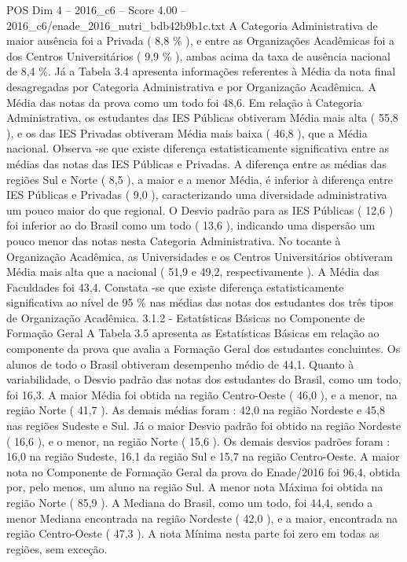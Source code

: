 \begin{textsample}{POS Dim 4 – 2016\_c6 – Score 4.00 – 2016\_c6/enade\_2016\_nutri\_bdb42b9b1c.txt}
A Categoria Administrativa de maior ausência foi a Privada ( 8,8 \% ), e entre as Organizações Acadêmicas foi a dos Centros Universitários ( 9,9 \% ), ambas acima da taxa de ausência nacional de 8,4 \%.
Já a Tabela 3.4 apresenta informações referentes à Média da nota final desagregadas por Categoria Administrativa e por Organização Acadêmica.
A Média das notas da prova como um todo foi 48,6.
Em relação à Categoria Administrativa, os estudantes das IES Públicas obtiveram Média mais alta ( 55,8 ), e os das IES Privadas obtiveram Média mais baixa ( 46,8 ), que a Média nacional.
Observa -se que existe diferença estatisticamente significativa entre as médias das notas das IES Públicas e Privadas.
A diferença entre as médias das regiões Sul e Norte ( 8,5 ), a maior e a menor Média, é inferior à diferença entre IES Públicas e Privadas ( 9,0 ), caracterizando uma diversidade administrativa um pouco maior do que regional.
O Desvio padrão para as IES Públicas ( 12,6 ) foi inferior ao do Brasil como um todo ( 13,6 ), indicando uma dispersão um pouco menor das notas nesta Categoria Administrativa.
No tocante à Organização Acadêmica, as Universidades e os Centros Universitários obtiveram Média mais alta que a nacional ( 51,9 e 49,2, respectivamente ).
A Média das Faculdades foi 43,4.
Constata -se que existe diferença estatisticamente significativa ao nível de 95 \% nas médias das notas dos estudantes dos três tipos de Organização Acadêmica. 3.1.2 - Estatísticas Básicas no Componente de Formação Geral A Tabela 3.5 apresenta as Estatísticas Básicas em relação ao componente da prova que avalia a Formação Geral dos estudantes concluintes.
Os alunos de todo o Brasil obtiveram desempenho médio de 44,1.
Quanto à variabilidade, o Desvio padrão das notas dos estudantes do Brasil, como um todo, foi 16,3.
A maior Média foi obtida na região Centro-Oeste ( 46,0 ), e a menor, na região Norte ( 41,7 ).
As demais médias foram : 42,0 na região Nordeste e 45,8 nas regiões Sudeste e Sul.
Já o maior Desvio padrão foi obtido na região Nordeste ( 16,6 ), e o menor, na região Norte ( 15,6 ).
Os demais desvios padrões foram : 16,0 na região Sudeste, 16,1 da região Sul e 15,7 na região Centro-Oeste.
A maior nota no Componente de Formação Geral da prova do Enade/2016 foi 96,4, obtida por, pelo menos, um aluno na região Sul.
A menor nota Máxima foi obtida na região Norte ( 85,9 ).
A Mediana do Brasil, como um todo, foi 44,4, sendo a menor Mediana encontrada na região Nordeste ( 42,0 ), e a maior, encontrada na região Centro-Oeste ( 47,3 ).
A nota Mínima nesta parte foi zero em todas as regiões, sem exceção.

\end{textsample}
